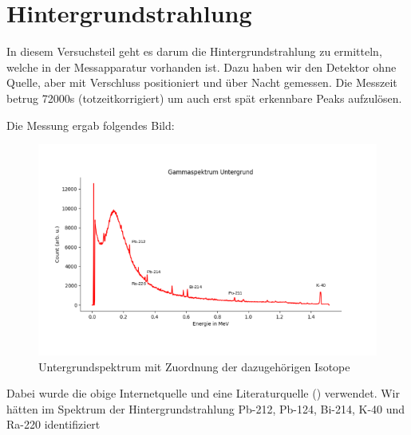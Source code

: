 \clearpage
\section{Hintergrundstrahlung}

In diesem Versuchsteil geht es darum die Hintergrundstrahlung zu ermitteln, welche in der Messapparatur vorhanden ist. Dazu haben wir 
den Detektor ohne Quelle, aber mit Verschluss positioniert und über Nacht gemessen. Die Messzeit betrug 72000s (totzeitkorrigiert) um auch erst 
spät erkennbare Peaks aufzulösen. 

Die Messung ergab folgendes Bild:

\begin{figure}[ht]
    \captionsetup{justification=centering,margin=2cm}
    \centering
    \includegraphics[angle = 90]{Bilder/Auswertung/Untergrund.png}
    \caption{Untergrundspektrum mit Zuordnung der dazugehörigen Isotope \protect \footnotemark}
\end{figure}
Dabei wurde die obige Internetquelle und eine Literaturquelle (\cite{Mende2016}) verwendet.
Wir hätten im Spektrum der Hintergrundstrahlung Pb-212, Pb-124, Bi-214, K-40 und Ra-220 identifiziert 